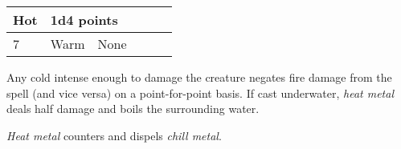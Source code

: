 \begin{longtable}{llllll}
{\begin{minipage}[t]{1.319in}
Hot\end{minipage}} & \multicolumn{4}{p{0.941in}|}{\begin{minipage}[t]{0.941in}\raggedright
1d4 points\end{minipage}}\\
\hline
\multicolumn{1}{p{0.069in}|}{\begin{minipage}[t]{0.069in}\raggedright
7\end{minipage}} & \multicolumn{1}{p{0.069in}|}{\begin{minipage}[t]{0.069in}\raggedright
Warm\end{minipage}} & \multicolumn{1}{p{0.069in}|}{\begin{minipage}[t]{0.069in}\raggedright
None\end{minipage}}\\
\hline
\end{longtable}

Any cold intense enough to damage the creature negates fire damage from the spell 
(and vice versa) on a point-for-point basis. If cast underwater, \textit{heat metal 
}deals half damage and boils the surrounding water.

\textit{Heat metal} counters and dispels \textit{chill metal}.

